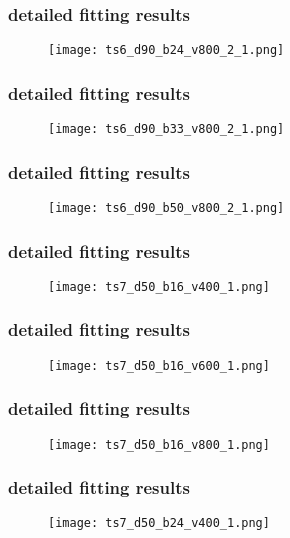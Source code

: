 	\begin{frame}
		\frametitle{\appendixname{} \textendash{} detailed fitting results}
		\begin{figure}
			\texttt{[image: ts6\_d90\_b24\_v800\_2\_1.png]}
		\end{figure}
	\end{frame}

	\begin{frame}
		\frametitle{\appendixname{} \textendash{} detailed fitting results}
		\begin{figure}
			\texttt{[image: ts6\_d90\_b33\_v800\_2\_1.png]}
		\end{figure}
	\end{frame}

	\begin{frame}
		\frametitle{\appendixname{} \textendash{} detailed fitting results}
		\begin{figure}
			\texttt{[image: ts6\_d90\_b50\_v800\_2\_1.png]}
		\end{figure}
	\end{frame}

	\begin{frame}
		\frametitle{\appendixname{} \textendash{} detailed fitting results}\label{app:details:ts7}
		\begin{figure}
			\texttt{[image: ts7\_d50\_b16\_v400\_1.png]}
		\end{figure}
	\end{frame}

	\begin{frame}
		\frametitle{\appendixname{} \textendash{} detailed fitting results}
		\begin{figure}
			\texttt{[image: ts7\_d50\_b16\_v600\_1.png]}
		\end{figure}
	\end{frame}

	\begin{frame}
		\frametitle{\appendixname{} \textendash{} detailed fitting results}
		\begin{figure}
			\texttt{[image: ts7\_d50\_b16\_v800\_1.png]}
		\end{figure}
	\end{frame}

	\begin{frame}
		\frametitle{\appendixname{} \textendash{} detailed fitting results}
		\begin{figure}
			\texttt{[image: ts7\_d50\_b24\_v400\_1.png]}
		\end{figure}
	\end{frame}

